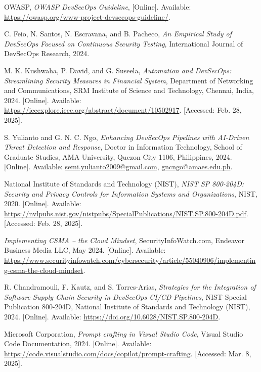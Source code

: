 \documentclass[conference]{IEEEtran}
\begin{document}
\begin{thebibliography}{9}

    OWASP, \textit{OWASP DevSecOps Guideline}, [Online]. Available: \url{https://owasp.org/www-project-devsecops-guideline/}.

    C. Feio, N. Santos, N. Escravana, and B. Pacheco, \textit{An Empirical Study of DevSecOps Focused on Continuous Security Testing}, International Journal of DevSecOps Research, 2024.

    M. K. Kushwaha, P. David, and G. Suseela, \textit{Automation and DevSecOps: Streamlining Security Measures in Financial System}, Department of Networking and Communications, SRM Institute of Science and Technology, Chennai, India, 2024. [Online]. Available: \url{https://ieeexplore.ieee.org/abstract/document/10502917}. [Accessed: Feb. 28, 2025].

    S. Yulianto and G. N. C. Ngo, \textit{Enhancing DevSecOps Pipelines with AI-Driven Threat Detection and Response}, Doctor in Information Technology, School of Graduate Studies, AMA University, Quezon City 1106, Philippines, 2024. [Online]. Available: \url{semi.yulianto2009@gmail.com}, \url{gncngo@amaes.edu.ph}.

    National Institute of Standards and Technology (NIST), \textit{NIST SP 800-204D: Security and Privacy Controls for Information Systems and Organizations}, NIST, 2020. [Online]. Available: \url{https://nvlpubs.nist.gov/nistpubs/SpecialPublications/NIST.SP.800-204D.pdf}. [Accessed: Feb. 28, 2025].

    \textit{Implementing CSMA – the Cloud Mindset}, SecurityInfoWatch.com, Endeavor Business Media LLC, May 2024. [Online]. Available: \url{https://www.securityinfowatch.com/cybersecurity/article/55040906/implementing-csma-the-cloud-mindset}.

    R. Chandramouli, F. Kautz, and S. Torres-Arias, \textit{Strategies for the Integration of Software Supply Chain Security in DevSecOps CI/CD Pipelines}, NIST Special Publication 800-204D, National Institute of Standards and Technology (NIST), 2024. [Online]. Available: \url{https://doi.org/10.6028/NIST.SP.800-204D}.

    Microsoft Corporation, \textit{Prompt crafting in Visual Studio Code}, Visual Studio Code Documentation, 2024. [Online]. Available: \url{https://code.visualstudio.com/docs/copilot/prompt-crafting}. [Accessed: Mar. 8, 2025].


\end{thebibliography}
\end{document}
